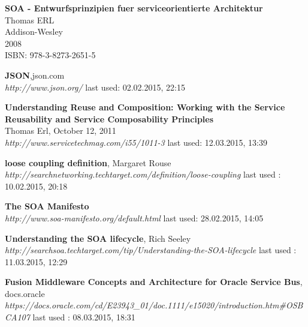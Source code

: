 \documentclass[12pt]{article}
\begin{document}
\begin{thebibliography}{56}
   \textbf{SOA - Entwurfsprinzipien fuer serviceorientierte Architektur}\\
   Thomas ERL\\
   Addison-Wesley \\
   2008 \\
	ISBN: 978-3-8273-2651-5 

  \textbf{JSON},json.com \\
  \textit{http://www.json.org/}
  \newline last used: 02.02.2015, 22:15

  
 
   \textbf{Understanding Reuse and Composition: 
Working with the Service Reusability and Service Composability Principles}\\ Thomas Erl, October 12, 2011 \\
  \textit{http://www.servicetechmag.com/i55/1011-3}
  \newline last used: 12.03.2015, 13:39 
 
 
 
 
   \textbf{loose coupling definition}, Margaret Rouse\\
  \textit{ 	 http://searchnetworking.techtarget.com/definition/loose-coupling}
  \newline last used : 10.02.2015, 20:18 	  
  
  


   \textbf{The SOA Manifesto} \\
  \textit{http://www.soa-manifesto.org/default.html}
  \newline last used: 28.02.2015, 14:05
  
 	 
   \textbf{Understanding the SOA lifecycle},  Rich Seeley\\
  \textit{ 	 http://searchsoa.techtarget.com/tip/Understanding-the-SOA-lifecycle}
  \newline last used : 11.03.2015, 12:29 	 
   	    
  
   	  	 
   \textbf{Fusion Middleware Concepts and Architecture for Oracle Service Bus}, docs.oracle\\
  \textit{    	  https://docs.oracle.com/cd/E23943\_01/doc.1111/e15020/introduction.htm\#OSBCA107
}
  \newline last used : 08.03.2015, 18:31 	 
  
  
  

\end{thebibliography}
\end{document}
